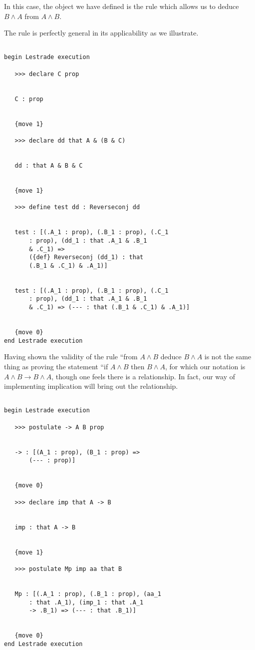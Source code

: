\documentclass[12pt]{article}
\begin{document}
In this case, the object we have defined is the rule which allows us to deduce $B \wedge A$ from $A \wedge B$.

The rule is perfectly general in its applicability as we illustrate.

\newpage

\begin{verbatim}

begin Lestrade execution

   >>> declare C prop


   C : prop


   {move 1}

   >>> declare dd that A & (B & C)


   dd : that A & B & C


   {move 1}

   >>> define test dd : Reverseconj dd


   test : [(.A_1 : prop), (.B_1 : prop), (.C_1 
       : prop), (dd_1 : that .A_1 & .B_1 
       & .C_1) => 
       ({def} Reverseconj (dd_1) : that 
       (.B_1 & .C_1) & .A_1)]


   test : [(.A_1 : prop), (.B_1 : prop), (.C_1 
       : prop), (dd_1 : that .A_1 & .B_1 
       & .C_1) => (--- : that (.B_1 & .C_1) & .A_1)]


   {move 0}
end Lestrade execution

\end{verbatim}

Having shown the validity of the rule ``from $A \wedge B$ deduce $B \wedge A$ is not the same thing as proving the
statement ``if $A \wedge B$ then $B \wedge A$, for which our notation is $A \wedge B \rightarrow B \wedge A$, though one feels there is a relationship.  In fact, our way of implementing implication will bring out the relationship.

\begin{verbatim}

begin Lestrade execution

   >>> postulate -> A B prop


   -> : [(A_1 : prop), (B_1 : prop) => 
       (--- : prop)]


   {move 0}

   >>> declare imp that A -> B


   imp : that A -> B


   {move 1}

   >>> postulate Mp imp aa that B


   Mp : [(.A_1 : prop), (.B_1 : prop), (aa_1 
       : that .A_1), (imp_1 : that .A_1 
       -> .B_1) => (--- : that .B_1)]


   {move 0}
end Lestrade execution

\end{verbatim}
\end{document}
